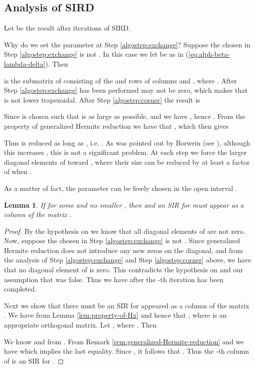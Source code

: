 \documentclass{sig-alternate}
\newtheorem{lem}[theorem]{Lemma}
\numberwithin{theorem}{section} \numberwithin{equation}{section}
\begin{document}
\subsection{Analysis of SIRD}
Let  be the result after   iterations of SIRD.

Why do we set the parameter  at Step
\ref{algostep:exchange}?  Suppose the  chosen in Step
\ref{algostep:exchange} is not . In this case we let  be as in (\ref{eq:alph-beta-lambda-delta}).
Then

is the submatrix of  consisting of the  and  rows
of columns  and , where .   After Step
\ref{algostep:exchange} has been performed  may not be
zero, which makes that  is not lower trapezoidal.  After Step \ref{algostep:corner} the result is

Since  is chosen such that  is as large
as possible, and  we have , hence . From the property of generalized Hermite
reduction we have that , which then gives

Thus  is reduced as long as , i.e. . As was pointed
out by Borwein (see \cite {Bor2002}), although this
increases , this is not a significant problem. At each
step we force the larger diagonal elements of  toward
, where their size can be reduced by at least a factor
of  when .

As a matter of fact, the parameter  can be freely chosen in
the open interval .



\begin{lem}\label{lem:Hn,n-2=0}
If  for some  and no smaller
, then  and an SIR for  must appear as a column of
the matrix .
\end{lem}
\begin{proof}
By the hypothesis on  we know that all diagonal elements of  are not zero. Now, suppose the  chosen in Step
\ref{algostep:exchange} is not . Since generalized Hermite
reduction does not introduce any new zeros on the diagonal, and from
the analysis of Step \ref{algostep:exchange} and Step
\ref{algostep:corner} above, we have that no diagonal element of
 is zero. This contradicts the hypothesis on  and our
assumption that  was false. Thus we have 
after the -th iteration has been completed.

Next we show that there must be an SIR for  appeared as a column
of the matrix . We have  from Lemma
\ref{lem:property-of-Hx} and hence that  , where  is an
appropriate orthogonal  matrix. Let
, where
. Then
 
We know  and 
from . From Remark
\ref{rem:generalized-Hermite-reduction} and  we have 
which implies the last equality. Since ,
it follows that . Thus the -th column of  is an SIR for .
\end{proof}
\end{document}
